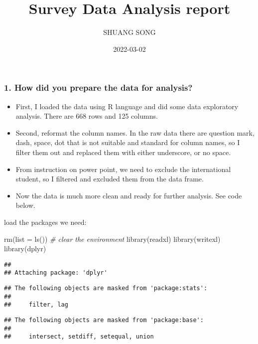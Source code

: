 \documentclass[
]{article}
\title{Survey Data Analysis report}
\author{SHUANG SONG}
\date{2022-03-02}
\newenvironment{Shaded}{\begin{snugshade}}{\end{snugshade}}
\newcommand{\AttributeTok}[1]{\textcolor[rgb]{0.77,0.63,0.00}{#1}}
\newcommand{\CommentTok}[1]{\textcolor[rgb]{0.56,0.35,0.01}{\textit{#1}}}
\newcommand{\FunctionTok}[1]{\textcolor[rgb]{0.00,0.00,0.00}{#1}}
\newcommand{\NormalTok}[1]{#1}
\providecommand{\tightlist}{%
  \setlength{\itemsep}{0pt}\setlength{\parskip}{0pt}}
\begin{document}
\maketitle

\hypertarget{how-did-you-prepare-the-data-for-analysis}{%
\subsubsection{1. How did you prepare the data for
analysis?}\label{how-did-you-prepare-the-data-for-analysis}}

\begin{itemize}
\tightlist
\item
  First, I loaded the data using R language and did some data
  exploratory analysis. There are 668 rows and 125 columns.
\item
  Second, reformat the column names. In the raw data there are question
  mark, dash, space, dot that is not suitable and standard for column
  names, so I filter them out and replaced them with either underscore,
  or no space.
\item
  From instruction on power point, we need to exclude the international
  student, so I filtered and excluded them from the data frame.
\item
  Now the data is much more clean and ready for further analysis. See
  code below.
\end{itemize}

load the packages we need:

\begin{Shaded}
\begin{Highlighting}[]
\FunctionTok{rm}\NormalTok{(}\AttributeTok{list =} \FunctionTok{ls}\NormalTok{()) }\CommentTok{\# clear the environment}
\FunctionTok{library}\NormalTok{(readxl)}
\FunctionTok{library}\NormalTok{(writexl)}
\FunctionTok{library}\NormalTok{(dplyr)}
\end{Highlighting}
\end{Shaded}

\begin{verbatim}
## 
## Attaching package: 'dplyr'
\end{verbatim}

\begin{verbatim}
## The following objects are masked from 'package:stats':
## 
##     filter, lag
\end{verbatim}

\begin{verbatim}
## The following objects are masked from 'package:base':
## 
##     intersect, setdiff, setequal, union
\end{verbatim}
\end{document}

